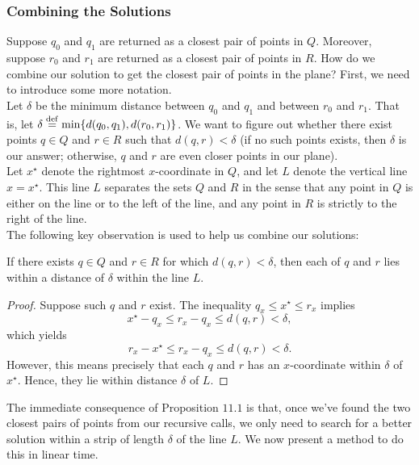 \subsubsection{Combining the Solutions}

Suppose $q_0$ and $q_1$ are returned as a closest pair of points in $Q$. Moreover, suppose $r_0$ and $r_1$ are returned as a closest pair of points in $R$. How do we combine our solution to get the closest pair of points in the plane? First, we need to introduce some more notation. \\

Let $\delta$ be the minimum distance between $q_0$ and $q_1$ and between $r_0$ and $r_1$. That is, let $\delta \overset{\mathrm{def}}{=} \min\{d(q_0, q_1), d(r_0, r_1)\}$. We want to figure out whether there exist points $q\in Q$ and $r\in R$ such that $d(q, r) < \delta$ (if no such points exists, then $\delta$ is our answer; otherwise, $q$ and $r$ are even closer points in our plane). \\

Let $x^{\star}$ denote the rightmost $x$-coordinate in $Q$, and let $L$ denote the vertical line $x = x^{\star}$. This line $L$ separates the sets $Q$ and $R$ in the sense that any point in $Q$ is either on the line or to the left of the line, and any point in $R$ is strictly to the right of the line. \\

The following key observation is used to help us combine our solutions:

\begin{proposition}
If there exists $q \in Q$ and $r \in R$ for which $d(q, r) < \delta$, then each of $q$ and $r$ lies within a distance of $\delta$ within the line $L$. 
\end{proposition}
\begin{proof}
Suppose such $q$ and $r$ exist. The inequality $q_x \leq x^{\star} \leq r_x$ implies
\[
x^{\star} - q_x \leq r_x - q_x \leq d(q, r) < \delta,
\]
which yields
\[
r_x - x^{\star} \leq r_x - q_x \leq d(q, r) < \delta.
\]
However, this means precisely that each $q$ and $r$ has an $x$-coordinate within $\delta$ of $x^{\star}$. Hence, they lie within distance $\delta$ of $L$.  
\end{proof}


The immediate consequence of Proposition $11.1$ is that, once we've found the two closest pairs of points from our recursive calls, we only need to search for a better solution within a strip of length $\delta$ of the line $L$. We now present a method to do this in linear time.  \\

